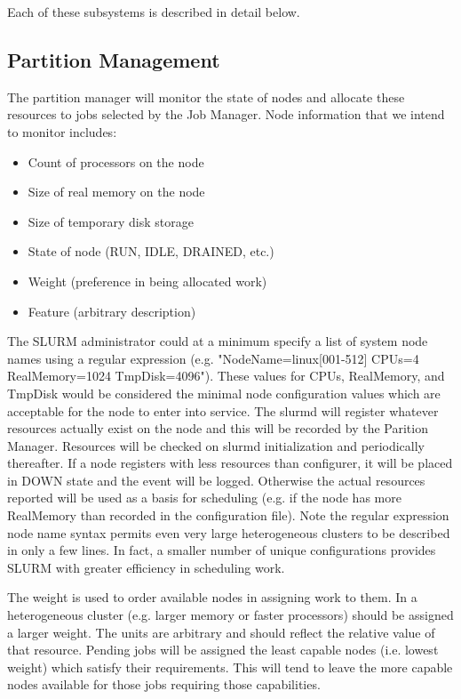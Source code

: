 Each of these subsystems is described in detail below.

\subsection{Partition Management}

The partition manager will monitor the state of nodes and allocate 
these resources to jobs selected by the Job Manager. 
Node information that we intend to monitor includes:

\begin{itemize}
\item Count of processors on the node
\item Size of real memory on the node
\item Size of temporary disk storage
\item State of node (RUN, IDLE, DRAINED, etc.)
\item Weight (preference in being allocated work)
\item Feature (arbitrary description)
\end{itemize}

The SLURM administrator could at a minimum specify a list of system node 
names using a regular expression (e.g. "NodeName=linux[001-512] CPUs=4 
RealMemory=1024 TmpDisk=4096"). 
These values for CPUs, RealMemory, and TmpDisk would be considered the 
minimal node configuration values which are acceptable for the node to 
enter into service. 
The slurmd will register whatever resources actually exist on the node 
and this will be recorded by the Parition Manager. 
Resources will be checked on slurmd initialization and periodically thereafter.
If a node registers with less resources than configurer, it will be placed 
in DOWN state and the event will be logged. 
Otherwise the actual resources reported will be used as a basis for 
scheduling (e.g. if the node has more RealMemory than recorded in the 
configuration file).
Note the regular expression node name syntax permits even very large heterogeneous 
clusters to be described in only a few lines. 
In fact, a smaller number of unique configurations provides SLURM with 
greater efficiency in scheduling work.

The weight is used to order available nodes in assigning work to them. 
In a heterogeneous cluster (e.g. larger memory or faster processors) 
should be assigned a larger weight. 
The units are arbitrary and should reflect the relative value of that resource. 
Pending jobs will be assigned the least capable nodes (i.e. lowest 
weight) which satisfy their requirements. 
This will tend to leave the more capable nodes available for those 
jobs requiring those capabilities. 

